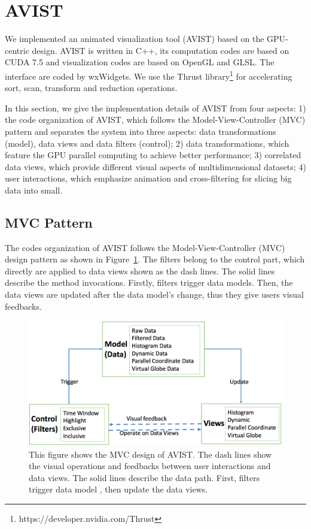 \section{AVIST}
We implemented an animated visualization tool (AVIST) based on the GPU-centric design.
AVIST is written in C++, its computation codes are based on CUDA 7.5 and visualization codes are based on OpenGL and GLSL. The interface are coded by wxWidgets. We use the Thrust library\footnote{https://developer.nvidia.com/Thrust} for accelerating sort, scan, transform and reduction operations.

 

In this section, we give the implementation details of AVIST from four aspects: 1) the code organization of AVIST, which follows the Model-View-Controller (MVC) pattern and separates the system into three aspects: data transformations (model), data views and data filters (control); 2) data transformations, which feature the GPU parallel computing to achieve better performance; 3) correlated data views, which provide different visual aspects of multidimensional datasets; 4) user interactions, which emphasize  animation and cross-filtering for slicing big data into small.

\subsection{MVC Pattern}
The codes organization of AVIST follows the Model-View-Controller (MVC) design pattern as shown in Figure~\ref{fig:mvc}. The filters belong to the control part, which directly are applied to data views shown as the dash lines. The solid lines describe the method invocations. Firstly, filters trigger data models. Then, the data views are updated after the data model's change, thus they give users visual feedbacks.

\begin{figure}[htb]
	\centering
	\includegraphics[width=1.0\linewidth]{pic/mvc.png}
	\parbox[t]{1.0\columnwidth}{\relax
	}
	\caption{\label{fig:mvc} This figure shows the MVC design of AVIST. The dash lines show the visual operations and feedbacks between user interactions and data views. The solid lines describe the data path. First, filters trigger data model , then update the data views.  }
\end{figure}    


